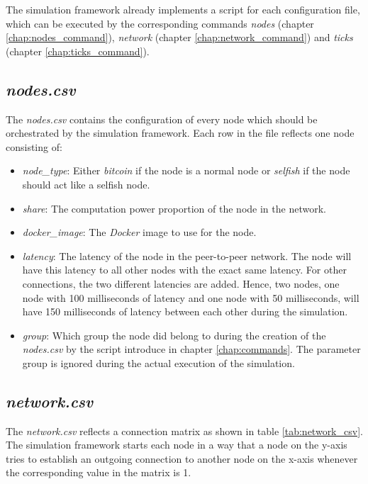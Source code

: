 The simulation framework already implements a script for each configuration file, which can be executed by the corresponding commands \textit{nodes} (chapter \ref{chap:nodes_command}), \textit{network} (chapter \ref{chap:network_command}) and \textit{ticks} (chapter \ref{chap:ticks_command}).

\subsection{\textit{nodes.csv}}

The \textit{nodes.csv} contains the configuration of every node which should be orchestrated by the simulation framework.
Each row in the file reflects one node consisting of:
\begin{itemize}
	\item \textit{node\_type}: Either \textit{bitcoin} if the node is a normal node or \textit{selfish} if the node should act like a selfish node.
	\item \textit{share}: The computation power proportion of the node in the network.
	\item \textit{docker\_image}: The \textit{Docker} image to use for the node.
	\item \textit{latency}: The latency  of the node in the peer-to-peer network.
	The node will have this latency to all other nodes with the exact same latency.
	For other connections, the two different latencies are added.
	Hence, two nodes, one node with 100 milliseconds of latency and one node with 50 milliseconds, will have 150 milliseconds of latency between each other during the simulation.
	\item \textit{group}: Which group the node did belong to during the creation of the \textit{nodes.csv} by the script introduce in chapter \ref{chap:commands}.
	The parameter group is ignored during the actual execution of the simulation.
\end{itemize}
 
\subsection{\textit{network.csv}}
The \textit{network.csv} reflects a connection matrix as shown in table \ref{tab:network_csv}.
The simulation framework starts each node in a way that a node on the y-axis tries to establish an outgoing connection to another node on the x-axis whenever the corresponding value in the matrix is 1.

